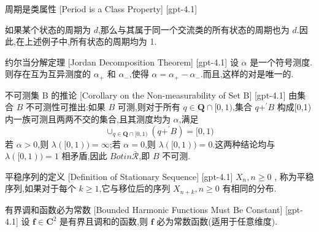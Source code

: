 \documentclass[UTF8]{ctexart}
\begin{document}
    
    
    \begin{thm}
        {周期是类属性}
        [Period is a Class Property]
        [gpt-4.1]
        
如果某个状态的周期为 $d$,那么与其属于同一个交流类的所有状态的周期也为 $d$.因此,在上述例子中,所有状态的周期均为 1.

    \end{thm}
    
    
    
    \begin{thm}
        {约尔当分解定理}
        [Jordan Decomposition Theorem]
        [gpt-4.1]
        设 $\alpha$ 是一个符号测度.则存在互为互异测度的 $\alpha_{+}$ 和 $\alpha_{-}$,使得 $\alpha = \alpha_{+} - \alpha_{-}$.而且,这样的对是唯一的.
    \end{thm}
    
    
    
    \begin{crl}
        {不可测集 B 的推论}
        [Corollary on the Non-measurability of Set B]
        [gpt-4.1]
        由集合 $B$ 不可测性可推出:如果 $B$ 可测,则对于所有 $q \in \mathbf{Q} \cap [0,1)$,集合 $q + ^{\prime} B$ 构成[0,1)内一族可测且两两不交的集合,且其测度均为 $\alpha$,满足
\[
\cup_{q \in \mathbf{Q}\cap[0,1)}(q + ^{\prime} B) = [0,1)
\]
若 $\alpha > 0$,则 $\lambda([0,1)) = \infty$;若 $\alpha = 0$,则 $\lambda([0,1)) = 0$.这两种结论均与 $\lambda([0,1)) = 1$ 相矛盾,因此 $B 
otin \bar{\mathcal{R}}$,即 $B$ 不可测.

    \end{crl}
    
    
    
    \begin{dfn}
        {平稳序列的定义}
        [Definition of Stationary Sequence]
        [gpt-4.1]
        $X _ { n } , n \geq 0$ , 称为平稳序列,如果对于每个 $k \geq 1$,它与移位后的序列 $X _ { n + k } , n \geq 0$ 有相同的分布.
    \end{dfn}
    
    
    
    \begin{thm}
        {有界调和函数必为常数}
        [Bounded Harmonic Functions Must Be Constant]
        [gpt-4.1]
        设 $\mathbf{f} \in \mathbf{C}^{2}$ 是有界且调和的函数,则 $\mathbf{f}$ 必为常数函数(适用于任意维度).
    \end{thm}
    
\end{document}
